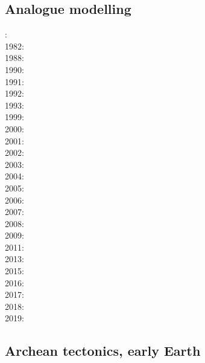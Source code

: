 \subsection{Analogue modelling}

{\scriptsize
{}: \cite{dixo75}\\
1982: \cite{tapl82}\\
1988: \cite{peta88}\cite{crud88}\\
1990: \cite{mccl90}\\
1991: \cite{daco91}\\
1992: \cite{salt92}\\
1993: \cite{nabr93}\cite{shem93}\\
1999: \cite{dava99}\cite{befo99}\cite{fagd99}\\
2000: \cite{sche00}\\
2001: \cite{haki01}\\
2002: \cite{dagl02}\\
2003: \cite{smbs03}\\
2004: \cite{sche04}\cite{sche04b}\\
2005: \cite{jujb05}\cite{sche05}\cite{sobb05}\\
2006: \cite{scbb06}\cite{tibs06}\\
2007: \cite{socb07}\\
2008: \cite{clbz08}\cite{fufh08}\\
2009: \cite{pina09}\\
2011: \cite{dalt11}\\
2013: \cite{luws13}\\
2015: \cite{casw15}\cite{rods15}\cite{kiff15}\\
2016: \cite{scbb16}\\
2017: \cite{casw17}\\
2018: \cite{pirf18}\\
2019: \cite{mocb19}\cite{sccs19}\cite{muwm19}
}

\subsection{Archean tectonics, early Earth}

